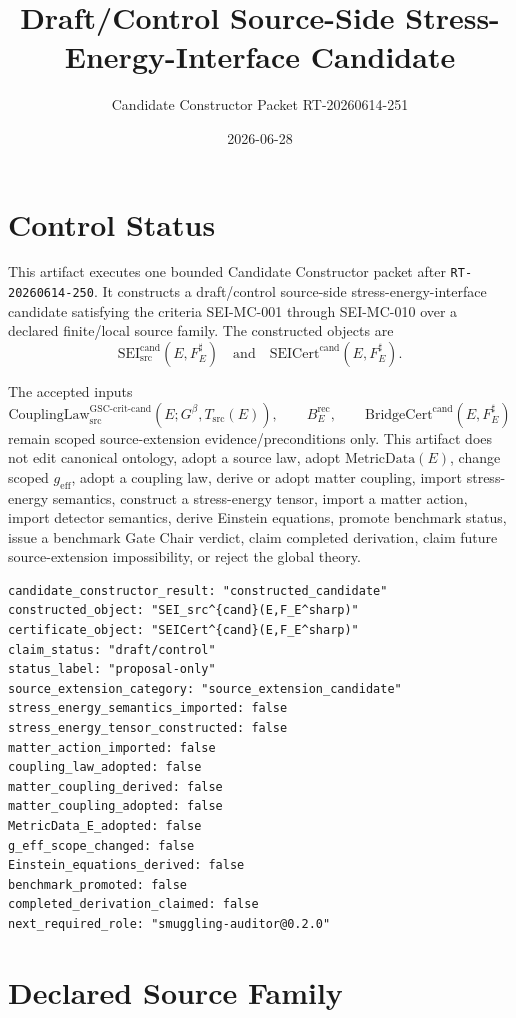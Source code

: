 \documentclass[11pt]{article}
\title{Draft/Control Source-Side Stress-Energy-Interface Candidate}
\author{Candidate Constructor Packet RT-20260614-251}
\date{2026-06-28}
\newcommand{\Gbeta}{G^\beta}
\newcommand{\MetricData}{\mathrm{MetricData}}
\newcommand{\geff}{g_{\mathrm{eff}}}
\newcommand{\CouplingLawCrit}{\mathrm{CouplingLaw}_{\mathrm{src}}^{\mathrm{GSC\mbox{-}crit\mbox{-}cand}}}
\newcommand{\BridgeCertCand}{\mathrm{BridgeCert}^{\mathrm{cand}}}
\newcommand{\BErec}{B_E^{\mathrm{rec}}}
\newcommand{\SEICand}{\mathrm{SEI}_{\mathrm{src}}^{\mathrm{cand}}}
\newcommand{\SEICertCand}{\mathrm{SEICert}^{\mathrm{cand}}}
\begin{document}
\maketitle

\section{Control Status}

This artifact executes one bounded Candidate Constructor packet after
\texttt{RT-20260614-250}. It constructs a draft/control source-side
stress-energy-interface candidate satisfying the criteria SEI-MC-001 through
SEI-MC-010 over a declared finite/local source family. The constructed
objects are
\[
  \SEICand(E,F_E^\sharp)
  \quad\text{and}\quad
  \SEICertCand(E,F_E^\sharp).
\]

The accepted inputs
\[
  \CouplingLawCrit(E;\Gbeta,T_{\mathrm{src}}(E)),
  \qquad
  \BErec,\qquad
  \BridgeCertCand(E,F_E^\sharp)
\]
remain scoped source-extension evidence/preconditions only. This artifact
does not edit canonical ontology, adopt a source law, adopt
\(\MetricData(E)\), change scoped \(\geff\), adopt a coupling law, derive or
adopt matter coupling, import stress-energy semantics, construct a
stress-energy tensor, import a matter action, import detector semantics,
derive Einstein equations, promote benchmark status, issue a benchmark Gate
Chair verdict, claim completed derivation, claim future source-extension
impossibility, or reject the global theory.

\begin{verbatim}
candidate_constructor_result: "constructed_candidate"
constructed_object: "SEI_src^{cand}(E,F_E^sharp)"
certificate_object: "SEICert^{cand}(E,F_E^sharp)"
claim_status: "draft/control"
status_label: "proposal-only"
source_extension_category: "source_extension_candidate"
stress_energy_semantics_imported: false
stress_energy_tensor_constructed: false
matter_action_imported: false
coupling_law_adopted: false
matter_coupling_derived: false
matter_coupling_adopted: false
MetricData_E_adopted: false
g_eff_scope_changed: false
Einstein_equations_derived: false
benchmark_promoted: false
completed_derivation_claimed: false
next_required_role: "smuggling-auditor@0.2.0"
\end{verbatim}

\section{Declared Source Family}
\end{document}
